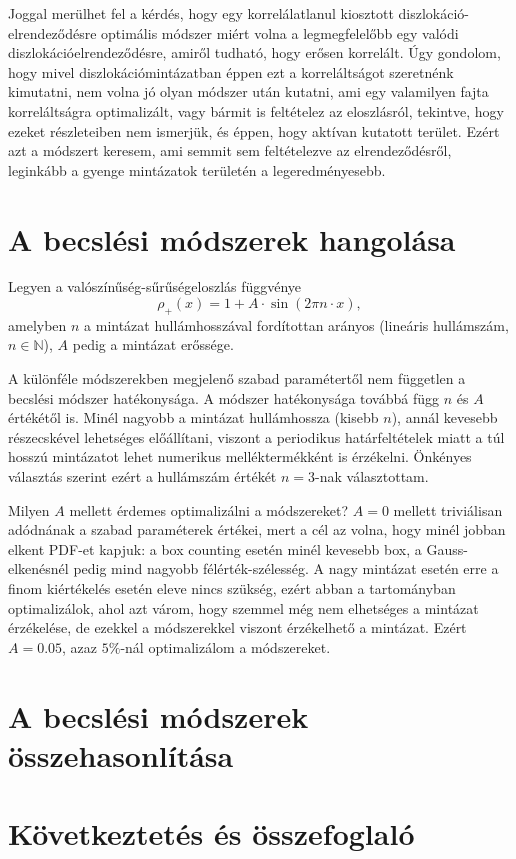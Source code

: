 \documentclass[10pt,a4paper]{scrartcl}
\begin{document}
Joggal merülhet fel a kérdés, hogy egy korrelálatlanul kiosztott diszlokáció-elrendeződésre optimális módszer miért volna a legmegfelelőbb egy valódi diszlokációelrendeződésre, amiről tudható, hogy erősen korrelált. Úgy gondolom, hogy mivel diszlokációmintázatban éppen ezt a korreláltságot szeretnénk kimutatni, nem volna jó olyan módszer után kutatni, ami egy valamilyen fajta korreláltságra optimalizált, vagy bármit is feltételez az eloszlásról, tekintve, hogy ezeket részleteiben nem ismerjük, és éppen, hogy aktívan kutatott terület. Ezért azt a módszert keresem, ami semmit sem feltételezve az elrendeződésről, leginkább a gyenge mintázatok területén a legeredményesebb.

\section{A becslési módszerek hangolása}
Legyen a valószínűség-sűrűségeloszlás függvénye
\[{\rho _ + }\left( x \right) = 1 + A \cdot \sin \left( {2\pi n \cdot x} \right),\]
amelyben $n$ a mintázat hullámhosszával fordítottan arányos (lineáris hullámszám, $n \in \mathbb{N}$), $A$ pedig a mintázat erőssége.

A különféle módszerekben megjelenő szabad paramétertől nem független a becslési módszer hatékonysága. A módszer hatékonysága továbbá függ $n$ és $A$ értékétől is. Minél nagyobb a mintázat hullámhossza (kisebb $n$), annál kevesebb részecskével lehetséges előállítani, viszont a periodikus határfeltételek miatt a túl hosszú mintázatot lehet numerikus melléktermékként is érzékelni. Önkényes választás szerint ezért a hullámszám értékét $n=3$-nak választottam.

Milyen $A$ mellett érdemes optimalizálni a módszereket? $A=0$ mellett triviálisan adódnának a szabad paraméterek értékei, mert a cél az volna, hogy minél jobban elkent PDF-et kapjuk: a box counting esetén minél kevesebb box, a Gauss-elkenésnél pedig mind nagyobb félérték-szélesség. A nagy mintázat esetén erre a finom kiértékelés esetén eleve nincs szükség, ezért abban a tartományban optimalizálok, ahol azt várom, hogy szemmel még nem elhetséges a mintázat érzékelése, de ezekkel a módszerekkel viszont érzékelhető a mintázat. Ezért $A=0.05$, azaz $5\%$-nál optimalizálom a módszereket.

\section{A becslési módszerek összehasonlítása}

\section{Következtetés és összefoglaló}
\end{document}
